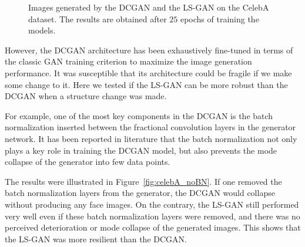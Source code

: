 \begin{figure}[t!]
{\begin{minipage}{0.35\linewidth}
\begin{center}
\end{center}
\end{minipage}}
   \caption{Images generated by the DCGAN and the LS-GAN on the CelebA dataset. The results are obtained after $25$ epochs of training the models.}\label{fig:celebA}
\end{figure}

However, the DCGAN architecture has been exhaustively fine-tuned in terms of the classic GAN training criterion to maximize the image generation performance. It was susceptible that its architecture could be fragile if we make some change to it. Here we tested if the LS-GAN can be more robust than the DCGAN when a structure change was made.

For example, one of the most key components in the DCGAN is the batch normalization inserted between the fractional convolution layers in the generator network. It has been reported in literature \cite{salimans2016improved} that the batch normalization not only plays a key role in training the DCGAN model, but also prevents the mode collapse of the generator into few data points.

The results were illustrated in Figure~\ref{fig:celebA_noBN}. If one removed the batch normalization layers from the generator, the DCGAN would collapse without producing any face images.  On the contrary, the LS-GAN still performed very well even if these batch normalization layers were removed, and there was { no perceived deterioration or mode collapse of the generated images}. This shows that the LS-GAN was more resilient than the DCGAN.

